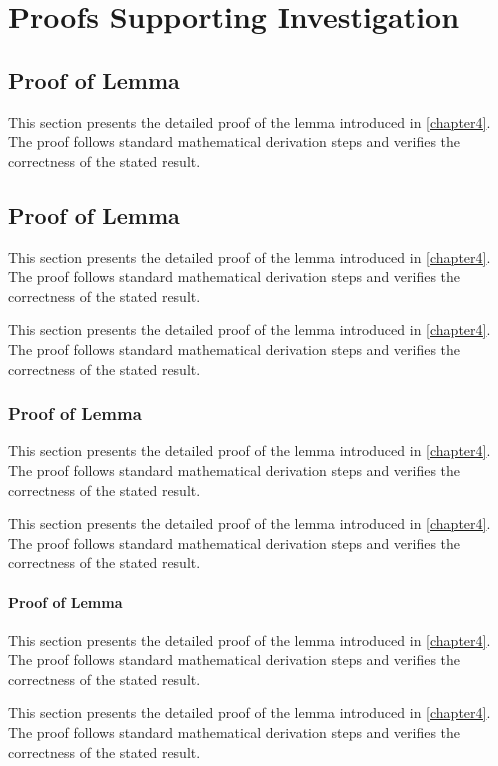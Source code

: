 \chapter{Proofs Supporting Investigation}
\label{appendix}

\section{Proof of Lemma}
\begin{paragraph}
This section presents the detailed proof of the lemma introduced in \autoref{chapter4}. The proof follows standard mathematical derivation steps and verifies the correctness of the stated result.
\end{paragraph}

\section{Proof of Lemma}
\begin{paragraph}
This section presents the detailed proof of the lemma introduced in \autoref{chapter4}. The proof follows standard mathematical derivation steps and verifies the correctness of the stated result.

This section presents the detailed proof of the lemma introduced in \autoref{chapter4}. The proof follows standard mathematical derivation steps and verifies the correctness of the stated result.
\end{paragraph}

\subsection{Proof of Lemma}
\begin{subparagraph}
This section presents the detailed proof of the lemma introduced in \autoref{chapter4}. The proof follows standard mathematical derivation steps and verifies the correctness of the stated result.

This section presents the detailed proof of the lemma introduced in \autoref{chapter4}. The proof follows standard mathematical derivation steps and verifies the correctness of the stated result.
\end{subparagraph}

\subsubsection{Proof of Lemma}
\begin{subsubparagraph}
This section presents the detailed proof of the lemma introduced in \autoref{chapter4}. The proof follows standard mathematical derivation steps and verifies the correctness of the stated result.

This section presents the detailed proof of the lemma introduced in \autoref{chapter4}. The proof follows standard mathematical derivation steps and verifies the correctness of the stated result.
\end{subsubparagraph}
